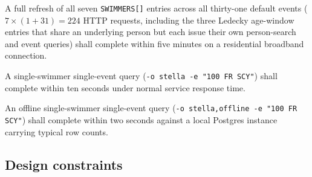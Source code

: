 \documentclass[12pt]{article}
\newcommand{\code}[1]{\texttt{#1}}
\newcommand{\req}[1]{\textbf{[#1]}}
\begin{document}
\begin{description}[style=nextline]
  \item[\req{REQ-P-01}] A full refresh of all seven
        \texttt{SWIMMERS[]} entries across all thirty-one default
        events ($7 \times (1 + 31) = 224$ HTTP requests, including
        the three Ledecky age-window entries that share an
        underlying person but each issue their own person-search
        and event queries) shall complete within five minutes on a
        residential broadband connection.
  \item[\req{REQ-P-02}] A single-swimmer single-event query
        (\code{-o stella -e "100 FR SCY"}) shall complete within
        ten seconds under normal service response time.
  \item[\req{REQ-P-03}] An offline single-swimmer single-event
        query (\code{-o stella,offline -e "100 FR SCY"}) shall
        complete within two seconds against a local Postgres
        instance carrying typical row counts.
\end{description}

\subsection{Design constraints}
\end{document}
